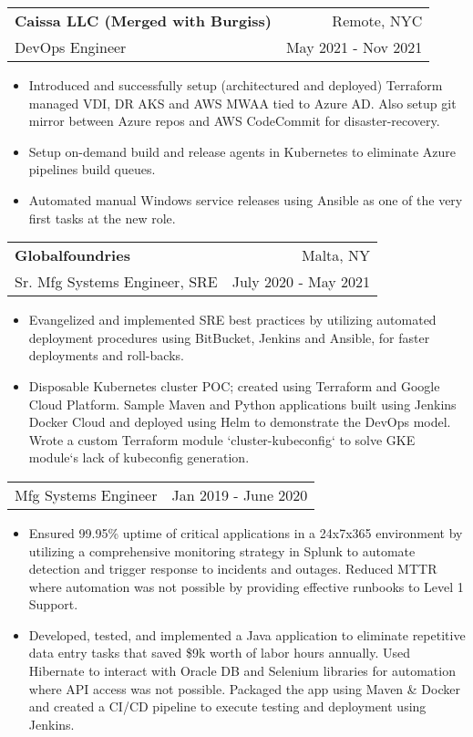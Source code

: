 \documentclass[letterpaper,11pt]{article}
\makeatletter
\newcommand{\resumeSubSubItem}[1]{
  \item\small{
    {#1}
  }
}
\newcommand{\resumeSubheading}[4]{
  \vspace{-1pt}\item
    \begin{tabular*}{0.97\textwidth}[t]{l@{\extracolsep{\fill}}r}
      \textbf{#1} & #2 \\
        \small #3 & \small #4 \\
    \end{tabular*}\vspace{-5pt}
}
\newcommand{\resumeSubSubheading}[2]{
    \begin{tabular*}{0.97\textwidth}{l@{\extracolsep{\fill}}r}
      \small #1 & \small #2 \\
    \end{tabular*}\vspace{-5pt}
}
\newcommand{\resumeItemListStart}{\begin{itemize}}
\newcommand{\resumeItemListEnd}{\end{itemize}\vspace{-5pt}}
\makeatother
\begin{document}
    \resumeSubheading
      {Caissa LLC (Merged with Burgiss)}{Remote, NYC}
      {DevOps Engineer}{May 2021 - Nov 2021}
      \resumeItemListStart
        \resumeSubSubItem
          {Introduced and successfully setup (architectured and deployed) Terraform managed VDI, DR AKS and AWS MWAA tied to Azure AD.
          Also setup git mirror between Azure repos and AWS CodeCommit for disaster-recovery.}
        \resumeSubSubItem
          {Setup on-demand build and release agents in Kubernetes to eliminate Azure pipelines build queues.}       
        \resumeSubSubItem
          {Automated manual Windows service releases using Ansible as one of the very first tasks at the new role.}                                     
      \resumeItemListEnd  

    \resumeSubheading
      {Globalfoundries}{Malta, NY}
      {Sr. Mfg Systems Engineer, SRE}{July 2020 - May 2021}
      \resumeItemListStart     
        \resumeSubSubItem
          {Evangelized and implemented SRE best practices by utilizing automated deployment procedures 
          using BitBucket, Jenkins and Ansible, for faster deployments and roll-backs.}
        \resumeSubSubItem
          {Disposable Kubernetes cluster POC; created using Terraform and Google Cloud Platform. 
          Sample Maven and Python applications built using Jenkins Docker Cloud and deployed using Helm 
          to demonstrate the DevOps model. Wrote a custom Terraform module `cluster-kubeconfig` 
          to solve GKE module`s lack of kubeconfig generation.}          
      \resumeItemListEnd
      
    \resumeSubSubheading
      {Mfg Systems Engineer}{Jan 2019 - June 2020}
      \resumeItemListStart
        \resumeSubSubItem
          {Ensured 99.95\% uptime of critical applications in a 24x7x365 environment by 
          utilizing a comprehensive monitoring strategy in Splunk to automate detection 
          and trigger response to incidents and outages. Reduced MTTR where automation 
          was not possible by providing effective runbooks to Level 1 Support.}
        \resumeSubSubItem
          {Developed, tested, and implemented a Java application to eliminate repetitive data entry 
          tasks that saved \$9k worth of labor hours annually. Used Hibernate to interact with 
          Oracle DB and Selenium libraries for automation where API access was not possible. 
          Packaged the app using Maven \& Docker and created a CI/CD pipeline to execute testing 
          and deployment using Jenkins.} 
      \resumeItemListEnd
\end{document}
